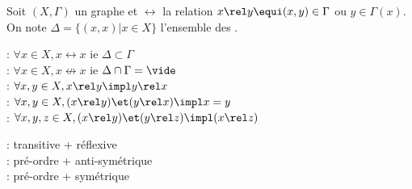 Soit $(X,\Gamma)$ un graphe et $\rel$ la relation $x\rel y \equi (x,y)\in\Gamma$ ou $y\in\Gamma(x)$.\\
On note $\Delta = \{(x,x) | x\in X\}$ l'ensemble des .\\

\par

 : $\forall x\in X, x\rel x$ ie $\Delta\subset\Gamma$\\
 : $\forall x\in X, x\not\rel x$ ie $\Delta\cap\Gamma=\vide$\\
 : $\forall x,y\in X, x\rel y \impl y\rel x$\\
 : $\forall x,y \in X, (x\rel y) \et (y\rel x) \impl x=y$\\
 : $\forall x,y,z\in X, (x\rel y) \et (y\rel z) \impl (x\rel z)$\\

\par
{} : transitive + réflexive \\
 : pré-ordre + anti-symétrique \\
 : pré-ordre + symétrique 
